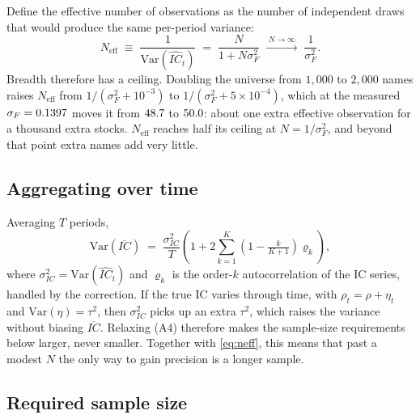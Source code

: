 \documentclass[11pt,a4paper]{article}
\newcommand{\ICh}{\widehat{IC}}
\newcommand{\Neff}{N_{\mathrm{eff}}}
\newcommand{\sF}{\sigma_F}
\begin{document}
Define the effective number of observations as the number of independent draws that
would produce the same per-period variance:
\begin{equation}
\Neff \;\equiv\; \frac{1}{\mathrm{Var}(\ICh_t)}
\;=\; \frac{N}{1 + N\sF^2}
\;\xrightarrow{\;N\to\infty\;}\; \frac{1}{\sF^2}.
\label{eq:neff}
\end{equation}
Breadth therefore has a ceiling. Doubling the universe from $1{,}000$ to $2{,}000$ names
raises $\Neff$ from $1/(\sF^2 + 10^{-3})$ to $1/(\sF^2 + 5\times10^{-4})$, which at the
measured $\sF = \momFloor$ moves it from $48.7$ to $50.0$: about one extra
effective observation for a thousand extra stocks. $\Neff$ reaches half its ceiling at
$N = 1/\sF^2$, and beyond that point extra names add very little.

\subsection{Aggregating over time}\label{sec:aggregate}

Averaging $T$ periods,
\begin{equation}
\mathrm{Var}(\overline{IC}) \;=\; \frac{\sigma_{IC}^2}{T}
\left(1 + 2\sum_{k=1}^{K}\left(1 - \tfrac{k}{K+1}\right)\varrho_k\right),
\label{eq:aggregate}
\end{equation}
where $\sigma_{IC}^2 = \mathrm{Var}(\ICh_t)$ and $\varrho_k$ is the order-$k$
autocorrelation of the IC series, handled by the \citet{newey1987simple} correction. If
the true IC varies through time, with $\rho_t = \rho + \eta_t$ and
$\mathrm{Var}(\eta) = \tau^2$, then $\sigma_{IC}^2$ picks up an extra $\tau^2$, which
raises the variance without biasing $\overline{IC}$. Relaxing (A4) therefore makes the
sample-size requirements below larger, never smaller. Together with \eqref{eq:neff},
this means that past a modest $N$ the only way to gain precision is a longer sample.

\subsection{Required sample size}\label{sec:power}
\end{document}
